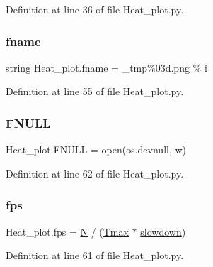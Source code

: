 Definition at line 36 of file Heat\+\_\+plot.\+py.

\mbox{\label{namespaceHeat__plot_a276f032cea9a4b8cf77208d165379e83}} 
\subsubsection{\texorpdfstring{fname}{fname}}
{\footnotesize\ttfamily string Heat\+\_\+plot.\+fname = \textquotesingle{}\+\_\+tmp\%03d.\+png\textquotesingle{} \% i}



Definition at line 55 of file Heat\+\_\+plot.\+py.

\mbox{\label{namespaceHeat__plot_aa171991dbe2271ffea72d0f8b97d2876}} 
\subsubsection{\texorpdfstring{F\+N\+U\+LL}{FNULL}}
{\footnotesize\ttfamily Heat\+\_\+plot.\+F\+N\+U\+LL = open(os.\+devnull, \textquotesingle{}w\textquotesingle{})}



Definition at line 62 of file Heat\+\_\+plot.\+py.

\mbox{\label{namespaceHeat__plot_a72be6747bea28a4edbd944d4f76fec68}} 
\subsubsection{\texorpdfstring{fps}{fps}}
{\footnotesize\ttfamily Heat\+\_\+plot.\+fps = \hyperlink{namespaceHeat__plot_a7d050092798e28458a263710837bda77}{N} / (\hyperlink{namespaceHeat__plot_a4af99e02cb1eac65ec68fab8d5446c4a}{Tmax} $\ast$ \hyperlink{namespaceHeat__plot_a116214d215b6a0e66aefae82e2bbd4ef}{slowdown})}



Definition at line 61 of file Heat\+\_\+plot.\+py.

\mbox{\label{namespaceHeat__plot_a01958ac77133cf99292b5a2cf0107f09}} 
